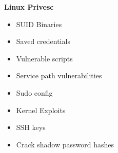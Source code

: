\documentclass[a4paper,10pt]{article}
\begin{document}
\begin{multicols}{2}
\begin{tcolorbox}[breakable,title=Windows Vista]
\end{tcolorbox}
\begin{tcolorbox}[breakable,title=Windows 7]
	
\end{tcolorbox}
\begin{tcolorbox}[breakable,title=Windows 8]
	
\end{tcolorbox}
\begin{tcolorbox}[breakable,title=Windows 8.1]
	
\end{tcolorbox}
\begin{tcolorbox}[breakable,title=Windows 10]
	
\end{tcolorbox}
\begin{tcolorbox}[breakable,title=Windows Server 2003]
	
\end{tcolorbox}
\begin{tcolorbox}[breakable,title=Windows Server 2008/R2]
	
\end{tcolorbox}
\begin{tcolorbox}[breakable,title=Windows Server 2012]
	
\end{tcolorbox}
\begin{tcolorbox}[breakable,title=Windows Server 2016]
	
\end{tcolorbox}
\begin{tcolorbox}[breakable,title=Windows Server 2019]
\end{tcolorbox}
\end{multicols}
\newpage
\Huge{\textbf{Linux Privesc}}
\newline
\normalsize
\begin{tcolorbox}[breakable,title=checklist]
\begin{itemize}
	\itemsep0em
	\item SUID Binaries
	\item Saved credentials
	\item Vulnerable scripts
	\item Service path vulnerabilities
	\item Sudo config
	\item Kernel Exploits
	\item SSH keys
	\item Crack shadow password hashes
\end{itemize}
\end{tcolorbox}
\end{document}
